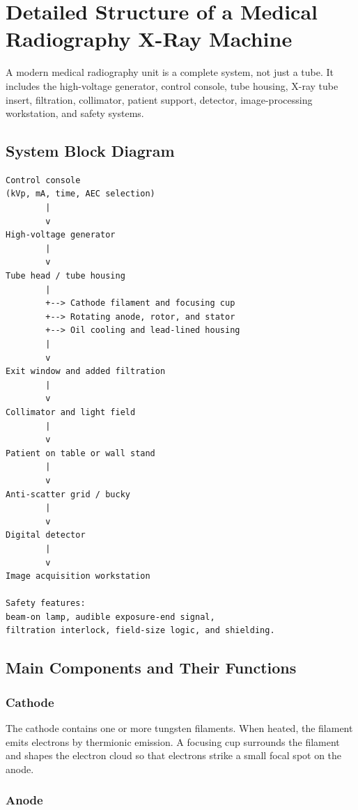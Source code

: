 \documentclass[12pt]{article}
\begin{document}
\section{Detailed Structure of a Medical Radiography X-Ray Machine}

A modern medical radiography unit is a complete system, not just a tube. It includes the high-voltage generator, control console, tube housing, X-ray tube insert, filtration, collimator, patient support, detector, image-processing workstation, and safety systems.

\subsection{System Block Diagram}

\begin{lstlisting}
Control console
(kVp, mA, time, AEC selection)
        |
        v
High-voltage generator
        |
        v
Tube head / tube housing
        |
        +--> Cathode filament and focusing cup
        +--> Rotating anode, rotor, and stator
        +--> Oil cooling and lead-lined housing
        |
        v
Exit window and added filtration
        |
        v
Collimator and light field
        |
        v
Patient on table or wall stand
        |
        v
Anti-scatter grid / bucky
        |
        v
Digital detector
        |
        v
Image acquisition workstation

Safety features:
beam-on lamp, audible exposure-end signal,
filtration interlock, field-size logic, and shielding.
\end{lstlisting}

\subsection{Main Components and Their Functions}

\subsubsection{Cathode}

The cathode contains one or more tungsten filaments. When heated, the filament emits electrons by thermionic emission. A focusing cup surrounds the filament and shapes the electron cloud so that electrons strike a small focal spot on the anode.

\subsubsection{Anode}
\end{document}
